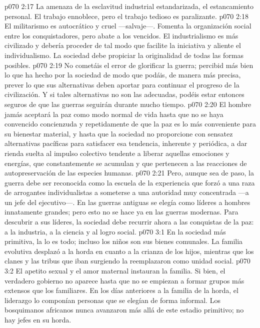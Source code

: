 \vs p070 2:17 La amenaza de la esclavitud industrial estandarizada, el estancamiento personal. El trabajo ennoblece, pero el trabajo tedioso es paralizante.
\vs p070 2:18 \pc El militarismo es autocrático y cruel ---salvaje---. Fomenta la organización social entre los conquistadores, pero abate a los vencidos. El industrialismo es más civilizado y debería proceder de tal modo que facilite la iniciativa y aliente el individualismo. La sociedad debe propiciar la originalidad de todas las formas posibles.
\vs p070 2:19 No cometáis el error de glorificar la guerra; percibid más bien lo que ha hecho por la sociedad de modo que podáis, de manera más precisa, prever lo que sus alternativas deben aportar para continuar el progreso de la civilización. Y si tales alternativas no son las adecuadas, podéis estar entonces seguros de que las guerras seguirán durante mucho tiempo.
\vs p070 2:20 El hombre jamás aceptará la paz como modo normal de vida hasta que no se haya convencido concienzuda y repetidamente de que la paz es lo más conveniente para su bienestar material, y hasta que la sociedad no proporcione con sensatez alternativas pacíficas para satisfacer esa tendencia, inherente y periódica, a dar rienda suelta al impulso colectivo tendente a liberar aquellas emociones y energías, que constantemente se acumulan y que pertenecen a las reacciones de autopreservación de las especies humanas.
\vs p070 2:21 Pero, aunque sea de paso, la guerra debe ser reconocida como la escuela de la experiencia que forzó a una raza de arrogantes individualistas a someterse a una autoridad muy concentrada ---a un jefe del ejecutivo---. En las guerras antiguas se elegía como líderes a hombres innatamente grandes; pero esto no se hace ya en las guerras modernas. Para descubrir a sus líderes, la sociedad debe recurrir ahora a las conquistas de la paz: a la industria, a la ciencia y al logro social.
\vs p070 3:1 En la sociedad más primitiva, la  lo es todo; incluso los niños son sus bienes comunales. La familia evolutiva desplazó a la horda en cuanto a la crianza de los hijos, mientras que los clanes y las tribus que iban surgiendo la reemplazaron como unidad social.
\vs p070 3:2 El apetito sexual y el amor maternal instauran la familia. Si bien, el verdadero gobierno no aparece hasta que no se empiezan a formar grupos más extensos que los familiares. En los días anteriores a la familia de la horda, el liderazgo lo componían personas que se elegían de forma informal. Los bosquimanos africanos nunca avanzaron más allá de este estadio primitivo; no hay jefes en su horda.
